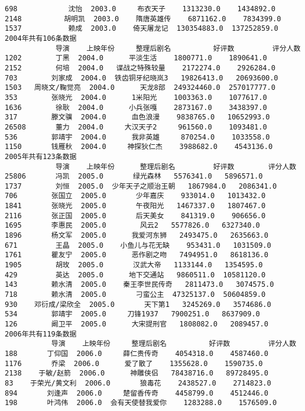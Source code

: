 \documentclass[11pt]{article}
\begin{document}
\begin{Verbatim}[commandchars=\\\{\}]
698            沈怡  2003.0     布衣天子    1313230.0    1434892.0
2148          胡明凯  2003.0    隋唐英雄传    6871162.0    7834399.0
1537           赖成  2003.0    倚天屠龙记  130354883.0  137252859.0
2004年共有106条数据
            导演    上映年份     整理后剧名          好评数         评分人数
1202        丁黑  2004.0      平淡生活    1800771.0    1890641.0
2152        何培  2004.0   谍战之特殊较量    2172274.0    2926284.0
703        刘家成  2004.0  铁齿铜牙纪晓岚3   19826413.0   20693600.0
1503   周晓文/鞠觉亮  2004.0      天龙8部  249324460.0  257017777.0
353        张晓光  2004.0      1米阳光    1003363.0    1077617.0
1636        徐耿  2004.0      小兵张嘎    2873167.0    3438397.0
317        滕文骥  2004.0      血色浪漫    9838765.0   10652993.0
26508       董力  2004.0     大汉天子2     961560.0    1093481.0
536        郭靖宇  2004.0      我非英雄     870254.0    1033558.0
1150       钱雁秋  2004.0     神探狄仁杰    3988682.0    4543136.0
2005年共有123条数据
            导演    上映年份      整理后剧名         好评数        评分人数
25806       冯凯  2005.0       绿光森林   5576341.0   5896571.0
1737        刘恒  2005.0  少年天子之顺治王朝   1867984.0   2086341.0
706        张国立  2005.0       少年嘉庆    933014.0   1013432.0
1841       张晓光  2005.0       午夜阳光   1467337.0   1807467.0
2116       张正国  2005.0       后天美女    841319.0    906656.0
1695       李惠民  2005.0        风云2   5577826.0   6327340.0
1896       杨文军  2005.0      我爱河东狮   2493475.0   2635663.0
671         王晶  2005.0    小鱼儿与花无缺    953431.0   1031509.0
1761       瞿友宁  2005.0      恶作剧之吻   7494951.0   8618136.0
1905        胡玫  2005.0       汉武大帝   1133144.0   1354595.0
429         英达  2005.0      地下交通站   9860511.0  10581120.0
143        赖水清  2005.0    秦王李世民传奇   2811473.0   3074575.0
718        赖水清  2005.0       刁蛮公主  47325137.0  50604859.0
930    邓衍成/梁欣全  2005.0       天下第1   3245269.0   3574686.0
534        郭靖宇  2005.0     刀锋1937   7900251.0   8637909.0
126        阚卫平  2005.0      大宋提刑官   1808082.0   2089457.0
2006年共有119条数据
           导演    上映年份     整理后剧名          好评数         评分人数
188       丁仰国  2006.0     薛仁贵传奇    4054318.0    4587460.0
1176       乔梁  2006.0      爱了散了    1355628.0    1590735.0
2138    于敏/赵箭  2006.0      神雕侠侣   78438716.0   89728495.0
83    于荣光/黄文利  2006.0       狼毒花    2438527.0    2714823.0
894       刘逢声  2006.0     楚留香传奇    4458799.0    4512446.0
198       叶鸿伟  2006.0  会有天使替我爱你    1283288.0    1576509.0

\end{Verbatim}
\end{document}
